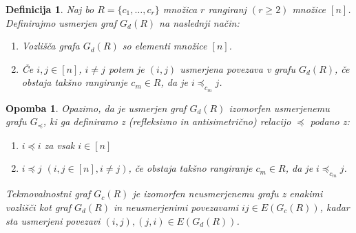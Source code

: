 \documentclass[a4paper, 12pt]{book}
\newtheorem{definicija}{Definicija}[chapter]
\newtheorem{opomba}{Opomba}[chapter]
\begin{document}

\begin{definicija}
    Naj bo $R = \{ c_1, \dots, c_r \}$ množica $r$ rangiranj $(r \geq 2)$ množice $[n]$. Definirajmo usmerjen graf $G_d(R)$  na naslednji način:
    \begin{enumerate}[label=(\roman*)]
        \item Vozlišča grafa $G_d(R)$ so elementi množice $[n]$.
        \item Če $i, j \in [n]$, $i \neq j$ potem je $(i, j)$ usmerjena povezava v grafu $G_d(R)$, če obstaja takšno rangiranje $c_m \in R$, da je $i \preceq_{c_m} j$.
    \end{enumerate}
\end{definicija}

\begin{opomba}
    Opazimo, da je usmerjen graf $G_d(R)$ izomorfen usmerjenemu grafu $G_{\preceq}$, ki ga definiramo z (refleksivno in antisimetrično) relacijo $\preceq$ podano z:
    \begin{enumerate}[label=(\roman*)]
        \item $i \preceq i$ za vsak $i \in [n]$
        \item $i \preceq j$ $(i,j \in [n], i \neq j)$, če obstaja takšno rangiranje $c_m \in R$, da je $i \preceq_{c_m} j$.
    \end{enumerate}
    Tekmovalnostni graf $G_c(R)$ je izomorfen neusmerjenemu grafu z enakimi vozlišči kot graf $G_d(R)$ in neusmerjenimi povezavami $ij \in E(G_c(R))$, kadar sta usmerjeni povezavi $(i, j), (j, i) \in E(G_d(R))$.
\end{opomba}
\end{document}
